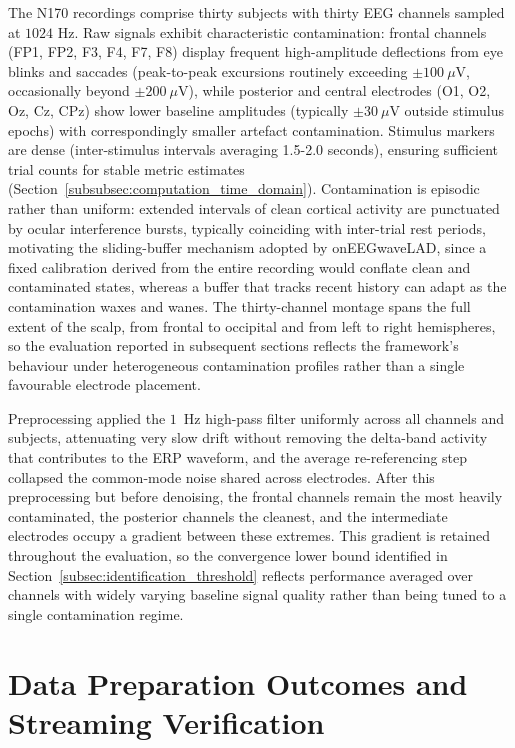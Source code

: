 \documentclass[MScCS,12pt,oneside,final]{uccthesis}
\begin{document}
The N170 recordings comprise thirty subjects with thirty EEG channels sampled at $1024$ Hz. Raw signals exhibit characteristic contamination: frontal channels (FP1, FP2, F3, F4, F7, F8) display frequent high-amplitude deflections from eye blinks and saccades (peak-to-peak excursions routinely exceeding $\pm 100~\mu$V, occasionally beyond $\pm 200~\mu$V), while posterior and central electrodes (O1, O2, Oz, Cz, CPz) show lower baseline amplitudes (typically $\pm 30~\mu$V outside stimulus epochs) with correspondingly smaller artefact contamination. Stimulus markers are dense (inter-stimulus intervals averaging 1.5-2.0 seconds), ensuring sufficient trial counts for stable metric estimates (Section~\ref{subsubsec:computation_time_domain}). Contamination is episodic rather than uniform: extended intervals of clean cortical activity are punctuated by ocular interference bursts, typically coinciding with inter-trial rest periods, motivating the sliding-buffer mechanism adopted by onEEGwaveLAD, since a fixed calibration derived from the entire recording would conflate clean and contaminated states, whereas a buffer that tracks recent history can adapt as the contamination waxes and wanes. The thirty-channel montage spans the full extent of the scalp, from frontal to occipital and from left to right hemispheres, so the evaluation reported in subsequent sections reflects the framework's behaviour under heterogeneous contamination profiles rather than a single favourable electrode placement.

Preprocessing applied the $1$~Hz high-pass filter uniformly across all channels and subjects, attenuating very slow drift without removing the delta-band activity that contributes to the ERP waveform, and the average re-referencing step collapsed the common-mode noise shared across electrodes. After this preprocessing but before denoising, the frontal channels remain  the most heavily contaminated, the posterior channels the cleanest, and the intermediate electrodes occupy a gradient between these extremes. This gradient is retained throughout the evaluation, so the convergence lower bound identified in Section~\ref{subsec:identification_threshold} reflects performance averaged over channels with widely varying baseline signal quality rather than being tuned to a single contamination regime.

\section{Data Preparation Outcomes and Streaming Verification}
\label{sec:data_prep_outcomes}
\end{document}
